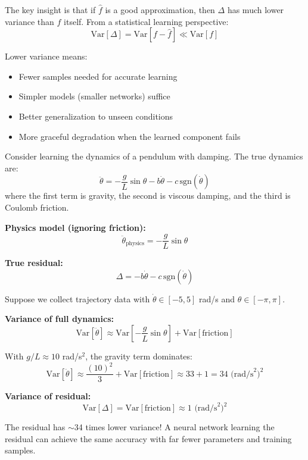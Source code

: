 The key insight is that if $\hat{f}$ is a good approximation, then $\Delta$ has much lower variance than $f$ itself. From a statistical learning perspective:
\begin{equation}
\text{Var}[\Delta] = \text{Var}[f - \hat{f}] \ll \text{Var}[f]
\end{equation}

Lower variance means:
\begin{itemize}
    \item Fewer samples needed for accurate learning
    \item Simpler models (smaller networks) suffice
    \item Better generalization to unseen conditions
    \item More graceful degradation when the learned component fails
\end{itemize}

\begin{example}
\label{ex:variance_reduction}

Consider learning the dynamics of a pendulum with damping. The true dynamics are:
\begin{equation}
\ddot{\theta} = -\frac{g}{L}\sin\theta - b\dot{\theta} - c\,\text{sgn}(\dot{\theta})
\end{equation}
where the first term is gravity, the second is viscous damping, and the third is Coulomb friction.

\textbf{Physics model (ignoring friction):}
\begin{equation}
\ddot{\theta}_{\text{physics}} = -\frac{g}{L}\sin\theta
\end{equation}

\textbf{True residual:}
\begin{equation}
\Delta = -b\dot{\theta} - c\,\text{sgn}(\dot{\theta})
\end{equation}

Suppose we collect trajectory data with $\dot{\theta} \in [-5, 5]$ rad/s and $\theta \in [-\pi, \pi]$.

\textbf{Variance of full dynamics:}
\begin{equation}
\text{Var}[\ddot{\theta}] \approx \text{Var}\left[-\frac{g}{L}\sin\theta\right] + \text{Var}[\text{friction}]
\end{equation}

With $g/L \approx 10$ rad/s$^2$, the gravity term dominates:
\begin{equation}
\text{Var}[\ddot{\theta}] \approx \frac{(10)^2}{3} + \text{Var}[\text{friction}] \approx 33 + 1 = 34 \text{ (rad/s}^2\text{)}^2
\end{equation}

\textbf{Variance of residual:}
\begin{equation}
\text{Var}[\Delta] = \text{Var}[\text{friction}] \approx 1 \text{ (rad/s}^2\text{)}^2
\end{equation}

The residual has $\sim$34 times lower variance! A neural network learning the residual can achieve the same accuracy with far fewer parameters and training samples.
\end{example}

